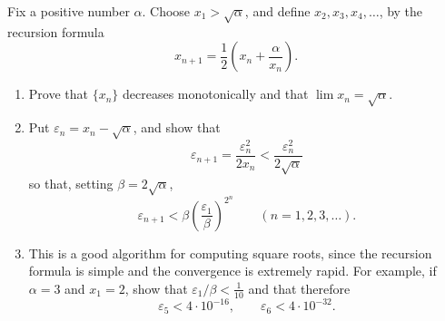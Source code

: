 \documentclass[main.tex]{subfiles}
\begin{document}
Fix a positive number $\alpha$. Choose $x_{1} > \sqrt{\alpha}$, and define $x_{2}, x_{3}, x_{4}, \ldots$, by the recursion formula
\[
x_{n+1} = \frac{1}{2}\left(x_{n} + \frac{\alpha}{x_{n}}\right).
\]
\begin{enumerate}
  \item Prove that $\{x_{n}\}$ decreases monotonically and that $\lim x_{n} = \sqrt{\alpha}$.
  \item Put $\varepsilon_{n} = x_{n} - \sqrt{\alpha}$, and show that
  \[
  \varepsilon_{n+1} = \frac{\varepsilon_{n}^{2}}{2 x_{n}} < \frac{\varepsilon_{n}^{2}}{2\sqrt{\alpha}}
  \]
  so that, setting $\beta = 2\sqrt{\alpha}$,
  \[
  \varepsilon_{n+1} < \beta \left(\frac{\varepsilon_{1}}{\beta}\right)^{2^{n}} \qquad (n = 1, 2, 3, \ldots).
  \]
  \item This is a good algorithm for computing square roots, since the recursion formula is simple and the convergence is extremely rapid. For example, if $\alpha = 3$ and $x_{1} = 2$, show that $\varepsilon_{1}/\beta < \frac{1}{10}$ and that therefore
  \[
  \varepsilon_{5} < 4 \cdot 10^{-16}, \qquad \varepsilon_{6} < 4 \cdot 10^{-32}.
  \]
\end{enumerate}
\end{document}
